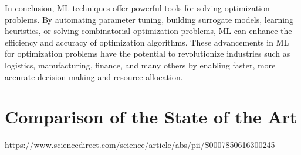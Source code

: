 In conclusion, ML techniques offer powerful tools for solving optimization problems. By automating parameter tuning, building surrogate models, learning heuristics, or solving combinatorial optimization problems, ML can enhance the efficiency and accuracy of optimization algorithms. These advancements in ML for optimization problems have the potential to revolutionize industries such as logistics, manufacturing, finance, and many others by enabling faster, more accurate decision-making and resource allocation.
\section{Comparison of the State of the Art}%
https://www.sciencedirect.com/science/article/abs/pii/S0007850616300245